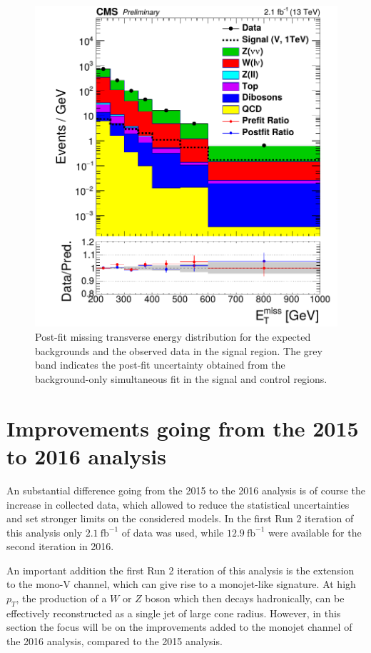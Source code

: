 \begin{figure}[p]
  \centering
 \includegraphics[width=.7\textwidth]{results.png} 
 \caption{Post-fit missing transverse energy distribution for the expected backgrounds and the observed data in the signal region. The grey band indicates the post-fit uncertainty obtained from the background-only simultaneous fit in the signal and control regions.}
 \label{fig:results}
\end{figure}

\section{Improvements going from the 2015 to 2016 analysis}
\label{sec:improvement}

An substantial difference going from the 2015 to the 2016 analysis is of course the increase in collected data, which allowed to reduce the statistical uncertainties and set stronger limits on the considered models. In the first Run 2 iteration of this analysis only $2.1\ \mathrm{fb}^{-1}$ of data was used, while $12.9\ \mathrm{fb}^{-1}$ were available for the second iteration in 2016.

An important addition the first Run 2 iteration of this analysis is the extension to the mono-V channel, which can give rise to a monojet-like signature. At high $p_T$, the production of a $W$ or $Z$ boson which then decays hadronically, can be effectively reconstructed as a single jet of large cone radius. However, in this section the focus will be on the improvements added to the monojet channel of the 2016 analysis, compared to the 2015 analysis.

